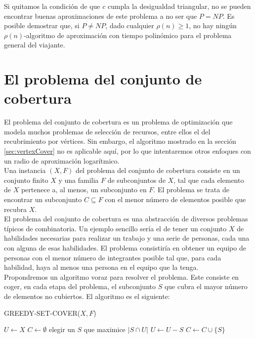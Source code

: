 \documentclass{article}
\begin{document}
Si quitamos la condición de que $c$ cumpla la desigualdad triangular, no se pueden encontrar buenas aproximaciones de este problema a no ser que $P = NP$. Es posible demostrar que, si $P \neq NP$, dado cualquier $\rho(n) \geq 1$, no hay ningún $\rho(n)$-algoritmo de aproximación con tiempo polinómico para el problema general del viajante.

\section{El problema del conjunto de cobertura}
El problema del conjunto de cobertura es un problema de optimización que modela muchos problemas de selección de recursos, entre ellos el del recubrimiento por vértices. Sin embargo, el algoritmo mostrado en la sección \ref{sec:vertexCover} no es aplicable aquí, por lo que intentaremos otros enfoques con un radio de aproximación logarítmico.\\

Una instancia $(X,F)$ del problema del conjunto de cobertura consiste en un conjunto finito $X$ y una familia $F$ de subconjuntos de $X$, tal que cada elemento de $X$ pertenece a, al menos, un subconjunto en $F$. El problema se trata de encontrar un subconjunto $C \subseteq F$ con el menor número de elementos posible que recubra $X$.\\

El problema del conjunto de cobertura es una abstracción de diversos problemas típicos de combinatoria. Un ejemplo sencillo sería el de tener un conjunto $X$ de habilidades necesarias para realizar un trabajo y una serie de personas, cada una con alguna de esas habilidades. El problema consistiría en obtener un equipo de personas con el menor número de integrantes posible tal que, para cada habilidad, haya al menos una persona en el equipo que la tenga.\\

Propondremos un algoritmo voraz para resolver el problema. Este consiste en coger, en cada etapa del problema, el subconjunto $S$ que cubra el mayor número de elementos no cubiertos. El algoritmo es el siguiente:\\

\begin{algorithm}[H]
\caption{GREEDY-SET-COVER($X,F$)}
\begin{algorithmic}[1]
\STATE $U \gets X$
\STATE $C \gets \emptyset$
\STATE elegir un $S$ que maximice $|S \cap U|$
\STATE $U \gets U - S$
\STATE $C \gets C \cup \{S\}$
\ENDWHILE
{}
\end{algorithmic}
\end{algorithm}
\end{document}

